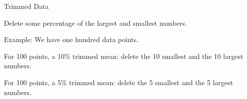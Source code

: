 \begin{frame}{Trimmed Data}

  Delete some percentage of the largest and smallest numbers.

  Example: 
  We have one hundred data points.

  \vfill

  For 100 points, a 10\% trimmed mean: delete the 10 smallest and the 10 largest
  numbers.

  \vfill

  For 100 points, a 5\% trimmed mean: delete the 5 smallest and the 5
  largest numbers.

  \vfill

\end{frame}



